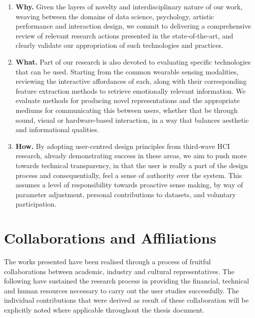 
\begin{enumerate}
    \item \textbf{Why.} Given the layers of novelty and interdisciplinary nature of our work, weaving between the domains of data science, psychology, artistic performance and interaction design, we commit to delivering a comprehensive review of relevant research actions presented in the state-of-the-art, and clearly validate our appropriation of such technologies and practices.

    \item \textbf{What.} Part of our research is also devoted to evaluating specific technologies that can be used. Starting from the common wearable sensing modalities, reviewing the interactive affordances of each, along with their corresponding feature extraction methods to retrieve emotionally relevant information. We evaluate methods for producing novel representations and the appropriate mediums for communicating this between users, whether that be through sound, visual or hardware-based interaction, in a way that balances aesthetic and informational qualities.

    \item \textbf{How.} By adopting user-centred design principles from third-wave HCI research, already demonstrating success in these areas, we aim to push more towards technical transparency, in that the user is really a part of the design process and consequentially, feel a sense of authority over the system. This assumes a level of responsibility towards proactive sense making, by way of parameter adjustment, personal contributions to datasets, and voluntary participation.
\end{enumerate}

\section{Collaborations and Affiliations}

The works presented have been realised through a process of fruitful collaborations between academic, industry and cultural representatives. The following have sustained the research process in providing the financial, technical and human resources necessary to carry out the user studies successfully. The individual contributions that were derived as result of these collaboration will be explicitly noted where applicable throughout the thesis document.

